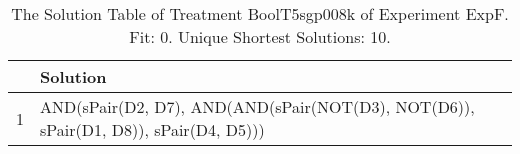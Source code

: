 \begin{table}[ht]
\centering
\begin{tabular}{rp{9cm}}
  \hline
 & Solution \\ 
  \hline
1 & AND(sPair(D2, D7), AND(AND(sPair(NOT(D3), NOT(D6)), sPair(D1, D8)), sPair(D4, D5))) \\ 
   \hline
\end{tabular}
\caption{The Solution Table of Treatment BoolT5sgp008k of Experiment ExpF. Fit: 0. Unique Shortest Solutions: 10.} 
\end{table}
